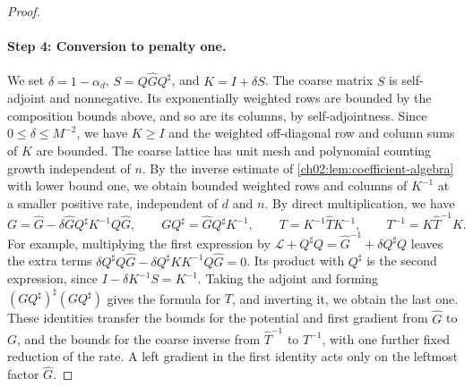 \begin{proof}
\paragraph{Step 4: Conversion to penalty one.}
We set $\delta=1-\alpha_d$, $S=Q\widehat GQ^\sharp$, and $K=I+\delta S$. The coarse matrix $S$ is self-adjoint and nonnegative. Its exponentially weighted rows are bounded by the composition bounds above, and so are its columns, by self-adjointness. Since $0\le\delta\le M^{-2}$, we have $K\ge I$ and the weighted off-diagonal row and column sums of $K$ are bounded. The coarse lattice has unit mesh and polynomial counting growth independent of $n$. By the inverse estimate of \cref{ch02:lem:coefficient-algebra} with lower bound one, we obtain bounded weighted rows and columns of $K^{-1}$ at a smaller positive rate, independent of $d$ and $n$. By direct multiplication, we have
\begin{equation}\label{ch06:eq:penalty-normalization}
 G=\widehat G-\delta\widehat GQ^\sharp K^{-1}Q\widehat G,\qquad GQ^\sharp=\widehat GQ^\sharp K^{-1},\qquad T=K^{-1}\widehat TK^{-1},\qquad T^{-1}=K\widehat T^{-1}K.
\end{equation}
For example, multiplying the first expression by $\mathscr L+Q^\sharp Q=\widehat G^{-1}+\delta Q^\sharp Q$ leaves the extra terms $\delta Q^\sharp Q\widehat G-\delta Q^\sharp KK^{-1}Q\widehat G=0$. Its product with $Q^\sharp$ is the second expression, since $I-\delta K^{-1}S=K^{-1}$. Taking the adjoint and forming $(GQ^\sharp)^\sharp(GQ^\sharp)$ gives the formula for $T$, and inverting it, we obtain the last one. These identities transfer the bounds for the potential and first gradient from $\widehat G$ to $G$, and the bounds for the coarse inverse from $\widehat T^{-1}$ to $T^{-1}$, with one further fixed reduction of the rate. A left gradient in the first identity acts only on the leftmost factor $\widehat G$.


\end{proof}
